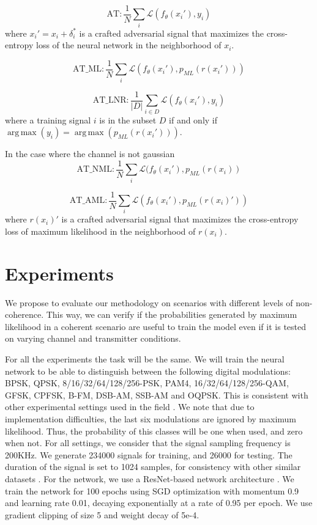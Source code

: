 \documentclass[conference]{IEEEtran}
\newcommand{\Ls}{\mathcal{L}}
\DeclareMathOperator*{\argmax}{arg\,max}
\begin{document}
\begin{equation}
    \text{AT} : \dfrac{1}{N}\sum_{i}\Ls(f_{\theta}(x_i'), y_i)
\end{equation}
where $x_i' = x_i + \delta_i^*$ is a crafted adversarial signal that maximizes the cross-entropy loss of the neural network in the neighborhood of $x_i$.

\begin{equation}
    \text{AT\_ML} : \dfrac{1}{N}\sum_{i}\Ls(f_{\theta}(x_i'), p_{ML}(r(x_i')))
\end{equation}

\begin{equation}
    \text{AT\_LNR} : \dfrac{1}{|D|}\sum_{i \in D}\Ls(f_{\theta}(x_i'), y_i)
\end{equation}
where a training signal $i$ is in the subset $D$ if and only if $\argmax(y_i) = \argmax(p_{ML}(r(x_i')))$.

In the case where the channel is not gaussian
\begin{equation}
    \text{AT\_NML} : \dfrac{1}{N}\sum_{i}\Ls(f_{\theta}(x_i'), p_{ML}(r(x_i))
\end{equation}

\begin{equation}
    \text{AT\_AML} : \dfrac{1}{N}\sum_{i}\Ls(f_{\theta}(x_i'), p_{ML}(r(x_i)'))
\end{equation}
where $r(x_i)'$ is a crafted adversarial signal that maximizes the cross-entropy loss of maximum likelihood in the neighborhood of $r(x_i)$.



\section{Experiments}

We propose to evaluate our methodology on scenarios with different levels of non-coherence. This way, we can verify if the probabilities generated by maximum likelihood in a coherent scenario are useful to train the model even if it is tested on varying channel and transmitter conditions. 

For all the experiments the task will be the same. We will train the neural network to be able to distinguish between the following digital modulations: BPSK, QPSK, 8/16/32/64/128/256-PSK, PAM4, 16/32/64/128/256-QAM, GFSK, CPFSK, B-FM, DSB-AM, SSB-AM and OQPSK. This is consistent with other experimental settings used in the field \cite{}. We note that due to implementation difficulties, the last six modulations are ignored by maximum likelihood. Thus, the probability of this classes will be one when used, and zero when not.
For all settings, we consider that the signal sampling frequency is 200KHz. We generate 234000 signals for training, and 26000 for testing. The duration of the signal is set to 1024 samples, for consistency with other similar datasets \cite{}. For the network, we use a ResNet-based network architecture \cite{}. We train the network for 100 epochs using SGD optimization with momentum 0.9 and learning rate 0.01, decaying exponentially at a rate of 0.95 per epoch. We use gradient clipping of size 5 and weight decay of 5e-4.
\end{document}
